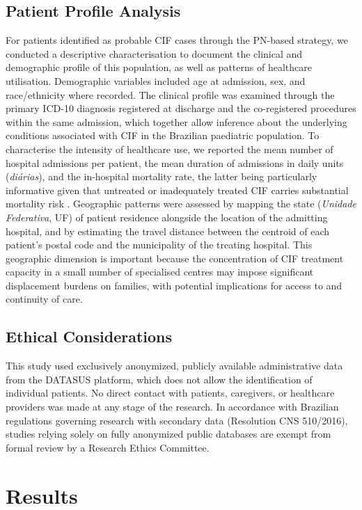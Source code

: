 \documentclass[pdflatex,sn-mathphys-num]{sn-jnl}
\theoremstyle{thmstyleone}%
\theoremstyle{thmstyletwo}%
\theoremstyle{thmstylethree}%
\begin{document}
\subsection*{Patient Profile Analysis}

For patients identified as probable CIF cases through the PN-based strategy, we conducted a descriptive characterisation to document the clinical and demographic profile of this population, as well as patterns of healthcare utilisation. Demographic variables included age at admission, sex, and race/ethnicity where recorded. The clinical profile was examined through the primary ICD-10 diagnosis registered at discharge and the co-registered procedures within the same admission, which together allow inference about the underlying conditions associated with CIF in the Brazilian paediatric population. To characterise the intensity of healthcare use, we reported the mean number of hospital admissions per patient, the mean duration of admissions in daily units (\textit{di\'{a}rias}), and the in-hospital mortality rate, the latter being particularly informative given that untreated or inadequately treated CIF carries substantial mortality risk \cite{mukhopadhyay2019}. Geographic patterns were assessed by mapping the state (\textit{Unidade Federativa}, UF) of patient residence alongside the location of the admitting hospital, and by estimating the travel distance between the centroid of each patient's postal code and the municipality of the treating hospital. This geographic dimension is important because the concentration of CIF treatment capacity in a small number of specialised centres may impose significant displacement burdens on families, with potential implications for access to and continuity of care.

\subsection*{Ethical Considerations}

This study used exclusively anonymized, publicly available administrative data from the DATASUS platform, which does not allow the identification of individual patients. No direct contact with patients, caregivers, or healthcare providers was made at any stage of the research. In accordance with Brazilian regulations governing research with secondary data (Resolution CNS 510/2016), studies relying solely on fully anonymized public databases are exempt from formal review by a Research Ethics Committee.


\section{Results}\label{sec3}
\end{document}
